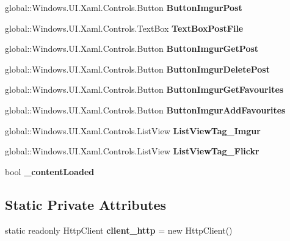 \begin{DoxyCompactItemize}
global\+::\+Windows.\+U\+I.\+Xaml.\+Controls.\+Button {\bfseries Button\+Imgur\+Post}
\item 
\mbox{\label{classepicture_1_1_main_page_aa8dc4dfee835aaae949a5a23d83bfb8a}} 
global\+::\+Windows.\+U\+I.\+Xaml.\+Controls.\+Text\+Box {\bfseries Text\+Box\+Post\+File}
\item 
\mbox{\label{classepicture_1_1_main_page_acd5b45578884cfdee08899b8c75f8271}} 
global\+::\+Windows.\+U\+I.\+Xaml.\+Controls.\+Button {\bfseries Button\+Imgur\+Get\+Post}
\item 
\mbox{\label{classepicture_1_1_main_page_a8c12009fcfe821c84efdae8adb7e29a3}} 
global\+::\+Windows.\+U\+I.\+Xaml.\+Controls.\+Button {\bfseries Button\+Imgur\+Delete\+Post}
\item 
\mbox{\label{classepicture_1_1_main_page_ab3b5cf1d5e80940653a925a2c0f418d5}} 
global\+::\+Windows.\+U\+I.\+Xaml.\+Controls.\+Button {\bfseries Button\+Imgur\+Get\+Favourites}
\item 
\mbox{\label{classepicture_1_1_main_page_a9e69e6fc57ee50ab59323c97c37ff076}} 
global\+::\+Windows.\+U\+I.\+Xaml.\+Controls.\+Button {\bfseries Button\+Imgur\+Add\+Favourites}
\item 
\mbox{\label{classepicture_1_1_main_page_aab6beb347ca56d458169b1c59b070fa6}} 
global\+::\+Windows.\+U\+I.\+Xaml.\+Controls.\+List\+View {\bfseries List\+View\+Tag\+\_\+\+Imgur}
\item 
\mbox{\label{classepicture_1_1_main_page_a28d96d93102a5420fefb1c5a0f38b7d1}} 
global\+::\+Windows.\+U\+I.\+Xaml.\+Controls.\+List\+View {\bfseries List\+View\+Tag\+\_\+\+Flickr}
\item 
\mbox{\label{classepicture_1_1_main_page_a1b8c972cd834fe801dd3d52ac47a6a4d}} 
bool {\bfseries \+\_\+content\+Loaded}
\end{DoxyCompactItemize}
\subsection*{Static Private Attributes}
\begin{DoxyCompactItemize}
\item 
\mbox{\label{classepicture_1_1_main_page_acd0d05d5ed8d0096df5eece5e2ad64b6}} 
static readonly Http\+Client {\bfseries client\+\_\+http} = new Http\+Client()
\end{DoxyCompactItemize}


